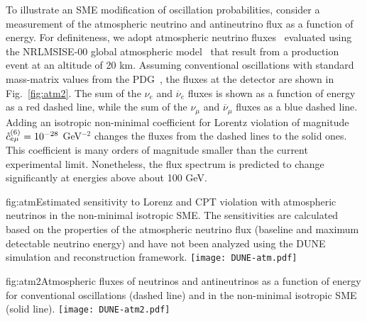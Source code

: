 To illustrate an SME modification of oscillation probabilities,
consider a measurement of the atmospheric neutrino and antineutrino flux
as a function of energy.
For definiteness,
we adopt atmospheric neutrino fluxes~\cite{Honda:2015fha}
evaluated using the NRLMSISE-00 global atmospheric model~\cite{Picone}
that result from a production event at an altitude of 20 km.
Assuming conventional oscillations with standard mass-matrix values from the PDG~\cite{Tanabashi:2018oca},
the fluxes at the detector are shown in Fig.\ \ref{fig:atm2}.
The sum of the $\nu_e$ and $\overline\nu_e$ fluxes
is shown as a function of energy as a red dashed line, 
while the sum of the $\nu_\mu$ and $\overline\nu_\mu$ fluxes 
as a blue dashed line. 
Adding an isotropic non-minimal coefficient for Lorentz violation
of magnitude $\mathaccent'27 c^{(6)}_{e \mu} = 10^{-28}$ GeV$^{-2}$
changes the fluxes from the dashed lines to the solid ones.
This coefficient is many orders of magnitude smaller
than the current experimental limit.
Nonetheless,
the flux spectrum is predicted to change significantly 
at energies above about 100 GeV. 

\begin{dunefigure}{fig:atm}{Estimated sensitivity to Lorenz and CPT violation with atmospheric neutrinos in the non-minimal isotropic SME. The sensitivities are calculated based on the properties of the atmospheric neutrino flux (baseline and maximum detectable neutrino energy) and have not been analyzed using the DUNE simulation and reconstruction framework.}
\texttt{[image: DUNE-atm.pdf]}
\end{dunefigure}

\begin{dunefigure}{fig:atm2}{Atmospheric fluxes of neutrinos and antineutrinos as a function of energy for conventional oscillations (dashed line) and in the non-minimal isotropic SME (solid line).}
\texttt{[image: DUNE-atm2.pdf]}
\end{dunefigure}


